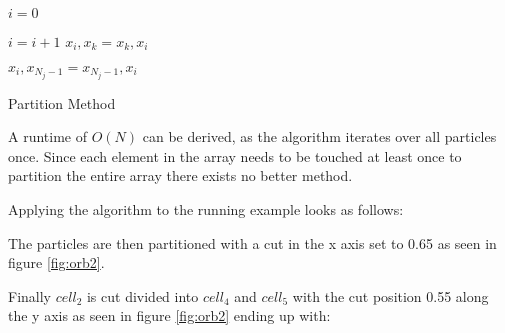 \documentclass[]{article}
\begin{document}
\algnewcommand{}


\begin{algorithm}[H]
	\begin{algorithmic}[1]
		\State $i = 0$
		
			\State $i = i + 1$
		\EndWhile
		\State $x_{i}, x_{k} = x_{k}, x_{i}$
		\EndIf
		\EndFor
		
		\State $ x_{i}, x_{N_j-1} = x_{N_j-1}, x_{i}$
		\EndProcedure
	\end{algorithmic}
\caption{Partition Method}
\label{proc:part}
\end{algorithm}

A runtime of $O(N)$ can be derived, as the algorithm iterates over all particles once. Since each element in the array needs to be touched at least once to partition the entire array there exists no better method.

Applying the algorithm to the running example looks as follows:

\begin{figure}[H]
	\begin{center}
	\end{center}
\end{figure}

The particles are then partitioned with a cut in the x axis set to 0.65 as seen in figure \ref{fig:orb2}.

\begin{figure}[H]
	\begin{center}
	\end{center}
\end{figure}

Finally $cell_2$ is cut divided into $cell_4$ and $cell_5$ with the cut position 0.55 along the y axis as seen in figure \ref{fig:orb2} ending up with:
\end{document}
